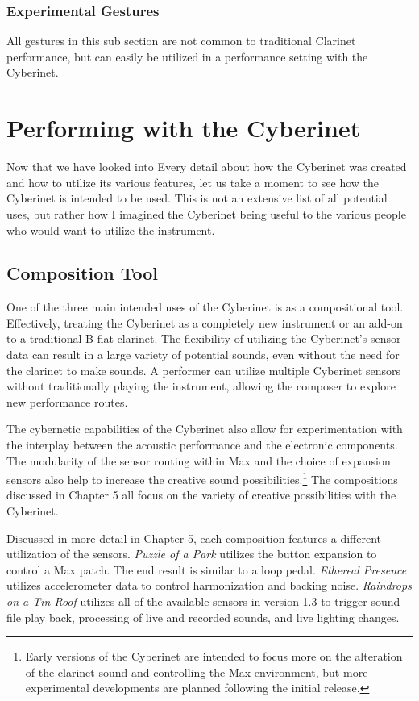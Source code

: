 \subsection{Experimental Gestures}
All gestures in this sub section are not common to traditional Clarinet performance, but can easily be utilized in a performance setting with the Cyberinet.

\chapter{Performing with the Cyberinet}
Now that we have looked into Every detail about how the Cyberinet was created and how to utilize its various features, let us take a moment to see how the Cyberinet is intended to be used. This is not an extensive list of all potential uses, but rather how I imagined the Cyberinet being useful to the various people who would want to utilize the instrument.


\section{Composition Tool}
One of the three main intended uses of the Cyberinet is as a compositional tool. Effectively, treating the Cyberinet as a completely new instrument or an add-on to a traditional B-flat clarinet. The flexibility of utilizing the Cyberinet's sensor data can result in a large variety of potential sounds, even without the need for the clarinet to make sounds. A performer can utilize multiple Cyberinet sensors without traditionally playing the instrument, allowing the composer to explore new performance routes.

The cybernetic capabilities of the Cyberinet also allow for experimentation with the interplay between the acoustic performance and the electronic components. The modularity of the sensor routing within Max and the choice of expansion sensors also help to increase the creative sound possibilities.\footnote{Early versions of the Cyberinet are intended to focus more on the alteration of the clarinet sound and controlling the Max environment, but more experimental developments are planned following the initial release.} The compositions discussed in Chapter 5 all focus on the variety of creative possibilities with the Cyberinet. 

Discussed in more detail in Chapter 5, each composition features a different utilization of the sensors. \textit{Puzzle of a Park} utilizes the button expansion to control a Max patch. The end result is similar to a loop pedal. \textit{Ethereal Presence} utilizes accelerometer data to control harmonization and backing noise. \textit{Raindrops on a Tin Roof} utilizes all of the available sensors in version 1.3 to trigger sound file play back, processing of live and recorded sounds, and live lighting changes.

